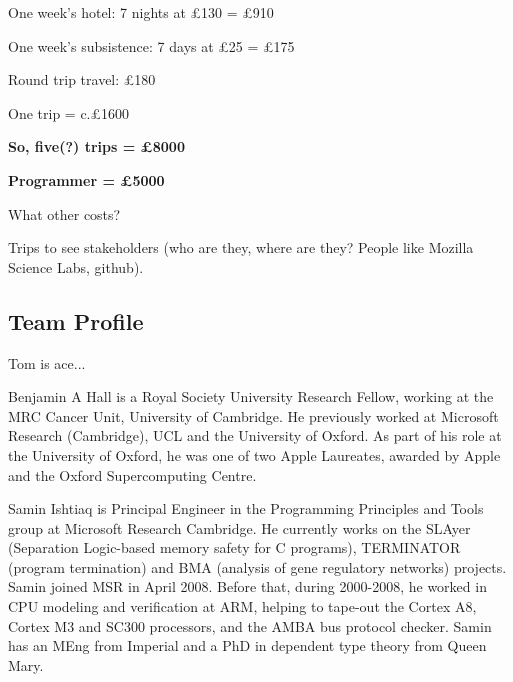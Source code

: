 \documentclass[a4paper,11pt]{article}
\begin{document}
One week's hotel: 7 nights at \pounds 130 = \pounds 910

One week's subsistence: 7 days at \pounds 25 = \pounds 175

Round trip travel: \pounds 180

One trip = c.£1600

{\textbf{So, five(?) trips = \pounds 8000}}

{\textbf{Programmer = \pounds 5000}}

What other costs?

Trips to see stakeholders (who are they, where are they? People like Mozilla Science Labs, github). 

\subsection*{Team Profile}


Tom is ace...

Benjamin A Hall is a Royal Society University Research Fellow, working at the MRC Cancer Unit, University of Cambridge. He previously worked at Microsoft Research (Cambridge), UCL and the University of Oxford. As part of his role at the University of Oxford, he was one of two Apple Laureates, awarded by Apple and the Oxford Supercomputing Centre.

Samin Ishtiaq is Principal Engineer in the Programming Principles and Tools group at Microsoft Research Cambridge. He currently works on the SLAyer (Separation Logic-based memory safety for C programs), TERMINATOR (program termination) and BMA (analysis of gene regulatory networks) projects. Samin joined MSR in April 2008. Before that, during 2000-2008, he worked in CPU modeling and verification at ARM, helping to tape-out the Cortex A8, Cortex M3 and SC300 processors, and the AMBA bus protocol checker. Samin has an MEng from Imperial and a PhD in dependent type theory from Queen Mary. 



\end{document}
